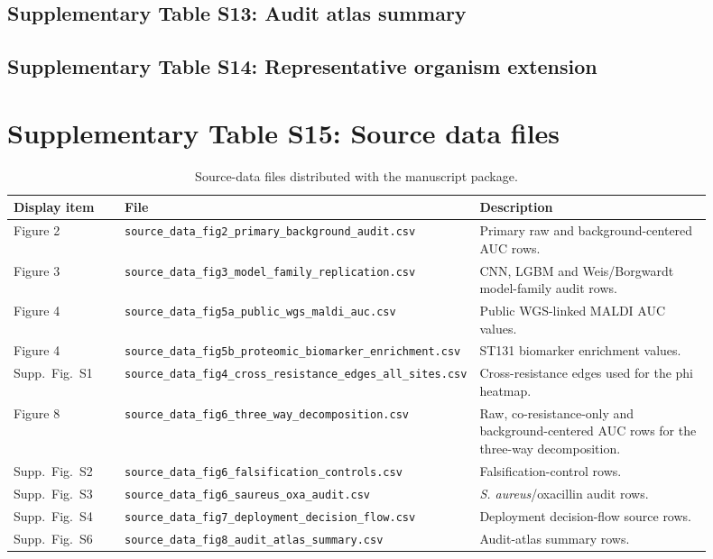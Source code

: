\documentclass[11pt]{article}
\begin{document}
\subsection*{Supplementary Table S13: Audit atlas summary}


\subsection*{Supplementary Table S14: Representative organism extension}


\section*{Supplementary Table S15: Source data files}

\begin{table}[ht]
\centering
\scriptsize
\caption{Source-data files distributed with the manuscript package.}
\begin{tabular}{p{0.16\linewidth}p{0.40\linewidth}p{0.34\linewidth}}
\toprule
Display item & File & Description \\
\midrule
Figure 2 & \texttt{source\_data\_fig2\_primary\_background\_audit.csv} & Primary raw and background-centered AUC rows. \\
Figure 3 & \texttt{source\_data\_fig3\_model\_family\_replication.csv} & CNN, LGBM and Weis/Borgwardt model-family audit rows. \\
Figure 4 & \texttt{source\_data\_fig5a\_public\_wgs\_maldi\_auc.csv} & Public WGS-linked MALDI AUC values. \\
Figure 4 & \texttt{source\_data\_fig5b\_proteomic\_biomarker\_enrichment.csv} & ST131 biomarker enrichment values. \\
Supp.\ Fig.\ S1 & \texttt{source\_data\_fig4\_cross\_resistance\_edges\_all\_sites.csv} & Cross-resistance edges used for the phi heatmap. \\
Figure 8 & \texttt{source\_data\_fig6\_three\_way\_decomposition.csv} & Raw, co-resistance-only and background-centered AUC rows for the three-way decomposition. \\
Supp.\ Fig.\ S2 & \texttt{source\_data\_fig6\_falsification\_controls.csv} & Falsification-control rows. \\
Supp.\ Fig.\ S3 & \texttt{source\_data\_fig6\_saureus\_oxa\_audit.csv} & \textit{S. aureus}/oxacillin audit rows. \\
Supp.\ Fig.\ S4 & \texttt{source\_data\_fig7\_deployment\_decision\_flow.csv} & Deployment decision-flow source rows. \\
Supp.\ Fig.\ S6 & \texttt{source\_data\_fig8\_audit\_atlas\_summary.csv} & Audit-atlas summary rows. \\
\bottomrule
\end{tabular}
\end{table}
\end{document}
